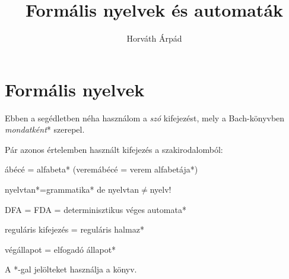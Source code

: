 \documentclass[a4paper]{article}
\begin{document}
\title{Formális nyelvek és automaták}
\author{Horváth Árpád}
\maketitle

\section{Formális nyelvek}

Ebben a segédletben néha használom a \emph{szó} kifejezést, mely a
Bach-könyvben \emph{mondatként}* szerepel.

Pár azonos értelemben használt kifejezés a szakirodalomból:

ábécé = alfabeta* (veremábécé = verem alfabetája*)

nyelvtan*=grammatika* de nyelvtan$\neq$nyelv!

DFA = FDA = determinisztikus véges automata*

reguláris kifejezés = reguláris halmaz*

végállapot = elfogadó állapot*

A *-gal jelölteket használja a könyv.
\end{document}
